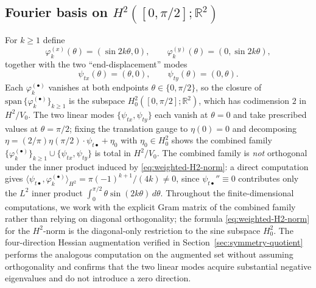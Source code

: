 \documentclass[11pt]{amsart}
\theoremstyle{plain}
\theoremstyle{definition}
\newcommand{\R}{\mathbb{R}}
\begin{document}
\subsection{Fourier basis on $H^{2}([0, \pi/2]; \R^{2})$}
For $k \geq 1$ define
\begin{equation}
  \varphi_{k}^{(x)}(\theta) = (\sin 2k\theta, 0),
  \qquad
  \varphi_{k}^{(y)}(\theta) = (0, \sin 2k\theta),
\end{equation}
together with the two ``end-displacement'' modes
\begin{equation}\label{eq:endpoint-modes}
   \psi_{tx}(\theta) = (\theta, 0), \qquad \psi_{ty}(\theta) = (0, \theta).
\end{equation}
Each $\varphi_{k}^{(\bullet)}$ vanishes at both endpoints
$\theta \in \{0, \pi/2\}$, so the closure of $\mathrm{span}\,
\{\varphi_{k}^{(\bullet)}\}_{k \geq 1}$ is the subspace
$H^{2}_{0}([0,\pi/2]; \R^{2})$, which has codimension $2$ in
$H^{2}/V_{0}$.  The two linear modes $\{\psi_{tx}, \psi_{ty}\}$
each vanish at $\theta = 0$ and take prescribed values at
$\theta = \pi/2$; fixing the translation gauge to
$\eta(0) = 0$ and decomposing
$\eta = (2/\pi)\eta(\pi/2) \cdot \psi_{t\bullet} + \eta_{0}$ with
$\eta_{0} \in H^{2}_{0}$ shows the combined family
$\{\varphi_{k}^{(\bullet)}\}_{k \geq 1} \cup \{\psi_{tx},
\psi_{ty}\}$ is total in $H^{2}/V_{0}$.  The combined family is
\emph{not} orthogonal under the inner product induced by
\eqref{eq:weighted-H2-norm}: a direct computation gives
$\langle \psi_{t\bullet}, \varphi_{k}^{(\bullet)}\rangle_{H^{2}} =
\pi(-1)^{k+1}/(4k) \neq 0$, since $\psi_{t\bullet}'' \equiv 0$
contributes only the $L^{2}$ inner product
$\int_{0}^{\pi/2}\theta\sin(2k\theta)\,d\theta$.  Throughout the
finite-dimensional computations, we work with the explicit Gram
matrix of the combined family rather than relying on diagonal
orthogonality; the formula \eqref{eq:weighted-H2-norm} for the
$H^{2}$-norm is the diagonal-only restriction to the sine subspace
$H^{2}_{0}$.  The four-direction Hessian augmentation verified in
Section~\ref{sec:symmetry-quotient} performs the analogous
computation on the augmented set without assuming orthogonality
and confirms that the two linear modes acquire substantial
negative eigenvalues and do not introduce a zero direction.
\end{document}
